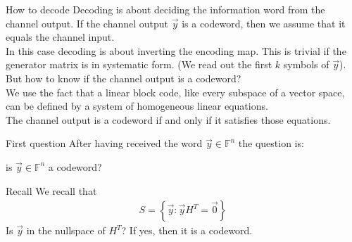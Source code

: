 
\begin{parag}{How to decode}
    Decoding is about deciding the information word from the channel output. If the channel output $\vec{y}$ is a codeword, then we assume that it equals the channel input.\\
    In this case decoding is about inverting the encoding map. This is trivial if the generator matrix is in systematic form. (We read out the first $k$ symbols of $\vec{y}$).\\
    But how to know if the channel output is a codeword?\\
    We use the fact that a linear block code, like every subspace of a vector space, can be defined by a system of homogeneous linear equations.\\
    The channel output is a codeword if and only if it satisfies those equations.
\end{parag}

\begin{parag}{First question}
    After having received the word $\vec{y} \in \mathbb{F}^n$ the question is:
    \begin{center}
        is $\vec{y} \in \mathbb{F}^n$ a codeword?
    \end{center}
    \begin{subparag}{Recall}
        We recall that 
        \begin{align*} S =  \left\{\vec{y} : \vec{y}H^T = \vec{0}\right\} \end{align*}
        Is $\vec{y}$ in the nullspace of $H^T$? If yes, then it is a codeword.
    \end{subparag}
\end{parag}


